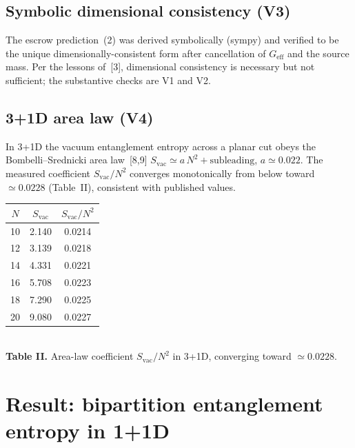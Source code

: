 \documentclass[11pt]{article}
\newcommand{\Svac}{S_{\mathrm{vac}}}
\begin{document}
\subsection{Symbolic dimensional consistency (V3)}
The escrow prediction~(2) was derived symbolically (sympy) and verified to be the unique
dimensionally-consistent form after cancellation of $G_{\mathrm{eff}}$ and the source mass. Per the
lessons of~[3], dimensional consistency is necessary but not sufficient; the substantive checks are V1
and V2.

\subsection{3+1D area law (V4)}
In 3+1D the vacuum entanglement entropy across a planar cut obeys the Bombelli--Srednicki area
law~[8,9] $\Svac \simeq a\,N^{2} + \text{subleading}$, $a \simeq 0.022$. The measured coefficient
$\Svac/N^{2}$ converges monotonically from below toward $\simeq 0.0228$ (Table~II), consistent with
published values.
\begin{center}
\begin{tabular}{ccc}
\toprule
$N$ & $\Svac$ & $\Svac/N^{2}$ \\
\midrule
10 & 2.140 & 0.0214 \\
12 & 3.139 & 0.0218 \\
14 & 4.331 & 0.0221 \\
16 & 5.708 & 0.0223 \\
18 & 7.290 & 0.0225 \\
20 & 9.080 & 0.0227 \\
\bottomrule
\end{tabular}
\\[2pt]
{\small \textbf{Table II.} Area-law coefficient $\Svac/N^{2}$ in 3+1D, converging toward $\simeq 0.0228$.}
\end{center}

\section{Result: bipartition entanglement entropy in 1+1D}
\end{document}
